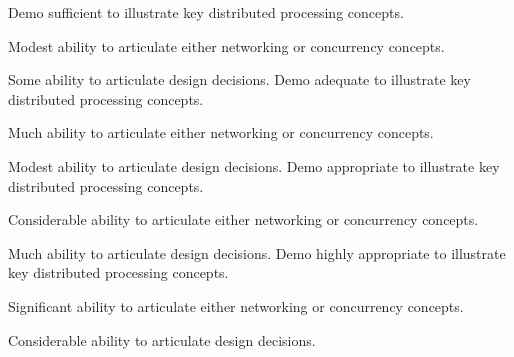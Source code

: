 \documentclass{../../fal_assignment}
\begin{document}
\begin{markingrubric}
        \grade Demo sufficient to illustrate key distributed processing concepts.
            \par Modest ability to articulate either networking or concurrency concepts.
            \par Some ability to articulate design decisions.
        \grade Demo adequate to illustrate key distributed processing concepts.
            \par Much ability to articulate either networking or concurrency concepts.
            \par Modest ability to articulate design decisions.
        \grade Demo appropriate to illustrate key distributed processing concepts.
            \par Considerable ability to articulate either networking or concurrency concepts.
            \par Much ability to articulate design decisions.
        \grade Demo highly appropriate to illustrate key distributed processing concepts.
            \par Significant ability to articulate either networking or concurrency concepts.
            \par Considerable ability to articulate design decisions.
\end{markingrubric}
\end{document}
